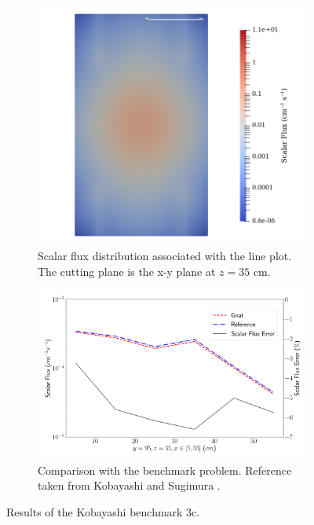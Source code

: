 \begin{figure}[H]
    \centering
    \begin{subfigure}[b]{0.4\textwidth}
        \centering
        \includegraphics[width=\textwidth]{images/verification/sn_kobayashi/3/kobayashi_3c_flux_map.png}
        \caption{Scalar flux distribution associated with the line plot. The cutting plane is the x-y plane at $z = 35\text{ cm}$.}
        \label{fig:verification:sn_kobayashi_3c:flux}
    \end{subfigure}
    \hfill
    \begin{subfigure}[b]{0.59\textwidth}
        \centering
        \includegraphics[width=\textwidth]{images/verification/sn_kobayashi/3/kobayashi_3c.png}
        \caption{Comparison with the benchmark problem. Reference taken from Kobayashi and Sugimura \cite{kobayashi_benchmarks}.}
        \label{fig:verification:sn_kobayashi_3c:line_plot}
    \end{subfigure}
    \caption{Results of the Kobayashi benchmark 3c.}
    \label{fig:verification:sn_kobayashi_3c}
\end{figure}

